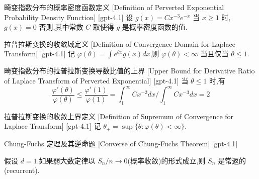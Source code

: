 \documentclass[UTF8]{ctexart}
\begin{document}
    
    
    \begin{dfn}
        {畸变指数分布的概率密度函数定义}
        [Definition of Perverted Exponential Probability Density Function]
        [gpt-4.1]
        设 $g(x) = C x^{-3} e^{-x}$ 当 $x \geq 1$ 时,$g(x) = 0$ 否则,其中常数 $C$ 取使得 $g$ 是概率密度函数的值.
    \end{dfn}
    
    
    
    \begin{dfn}
        {拉普拉斯变换的收敛域定义}
        [Definition of Convergence Domain for Laplace Transform]
        [gpt-4.1]
        记 $\varphi ( \theta ) = \int e^{\theta x} g(x) dx$,则 $\varphi ( \theta ) < \infty$ 当且仅当 $\theta \leq 1$.
    \end{dfn}
    
    
    
    \begin{ppt}
        {畸变指数分布的拉普拉斯变换导数比值的上界}
        [Upper Bound for Derivative Ratio of Laplace Transform of Perverted Exponential]
        [gpt-4.1]
        当 $\theta \leq 1$ 时,有
\[
\frac{ \varphi' ( \theta ) }{ \varphi( \theta ) } \leq \frac{ \varphi'(1) }{ \varphi(1) } = \int_{1}^{\infty} C x^{-2} dx \Big/ \int_{1}^{\infty} C x^{-3} dx = 2
\]

    \end{ppt}
    
    
    
    \begin{dfn}
        {拉普拉斯变换的收敛上界定义}
        [Definition of Supremum of Convergence for Laplace Transform]
        [gpt-4.1]
        记 $\theta_{+} = \operatorname{sup} \{ \theta : \varphi( \theta ) < \infty \}$.
    \end{dfn}
    
    
    
    \begin{thm}
        {Chung-Fuchs 定理及其逆命题}
        [Converse of Chung-Fuchs Theorem]
        [gpt-4.1]
        
假设 $d=1$.如果弱大数定律以 $S_n / n \to 0$(概率收敛)的形式成立,则 $S_n$ 是常返的(recurrent).

    \end{thm}
    
\end{document}

